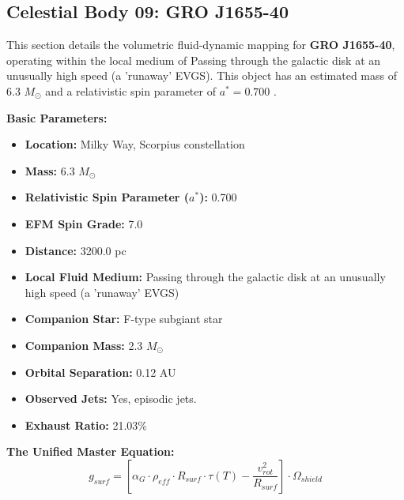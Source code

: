 \documentclass[11pt, a4paper]{article}
\begin{document}
\clearpage
\subsection{Celestial Body 09: GRO J1655-40}
This section details the volumetric fluid-dynamic mapping for \textbf{GRO J1655-40}, operating within the local medium of Passing through the galactic disk at an unusually high speed (a 'runaway' EVGS). This object has an estimated mass of 6.3 $M_{\odot}$ and a relativistic spin parameter of $a^* = 0.700$ \cite{orosz1997, simbad}.

\vspace{0.5em}
\noindent \textbf{Basic Parameters:}
\begin{itemize}
  \item \textbf{Location:} Milky Way, Scorpius constellation
  \item \textbf{Mass:} 6.3 $M_{\odot}$
  \item \textbf{Relativistic Spin Parameter ($a^*$):} 0.700
  \item \textbf{EFM Spin Grade:} 7.0
  \item \textbf{Distance:} 3200.0 pc
  \item \textbf{Local Fluid Medium:} Passing through the galactic disk at an unusually high speed (a 'runaway' EVGS)
  \item \textbf{Companion Star:} F-type subgiant star
  \item \textbf{Companion Mass:} 2.3 $M_{\odot}$
  \item \textbf{Orbital Separation:} 0.12 AU
  \item \textbf{Observed Jets:} Yes, episodic jets.
  \item \textbf{Exhaust Ratio:} 21.03\%
\end{itemize}

\vspace{0.5em}
\noindent \textbf{The Unified Master Equation:}
$$ g_{surf} = \left[ \alpha_G \cdot \rho_{eff} \cdot R_{surf} \cdot \tau(T) - \frac{v_{rot}^2}{R_{surf}} \right] \cdot \Omega_{shield} $$
\end{document}
